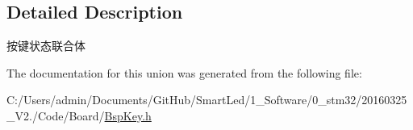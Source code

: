 \subsection{\-Detailed \-Description}
按键状态联合体 

\-The documentation for this union was generated from the following file\-:\begin{DoxyCompactItemize}
\item 
\-C\-:/\-Users/admin/\-Documents/\-Git\-Hub/\-Smart\-Led/1\-\_\-\-Software/0\-\_\-stm32/20160325\-\_\-\-V2./\-Code/\-Board/\hyperlink{_bsp_key_8h}{\-Bsp\-Key.\-h}\end{DoxyCompactItemize}
